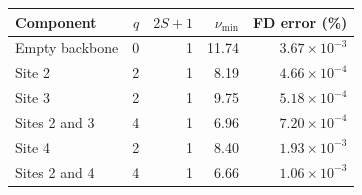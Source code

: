 \begin{tabular}{lrrrr}\toprule
Component & $q$ & $2S+1$ & $\nu_{\min}$ & FD error (\%)\\\midrule
Empty backbone & 0 & 1 & 11.74 & $3.67\times10^{-3}$\\
Site 2 & 2 & 1 & 8.19 & $4.66\times10^{-4}$\\
Site 3 & 2 & 1 & 9.75 & $5.18\times10^{-4}$\\
Sites 2 and 3 & 4 & 1 & 6.96 & $7.20\times10^{-4}$\\
Site 4 & 2 & 1 & 8.40 & $1.93\times10^{-3}$\\
Sites 2 and 4 & 4 & 1 & 6.66 & $1.06\times10^{-3}$\\
\bottomrule\end{tabular}
